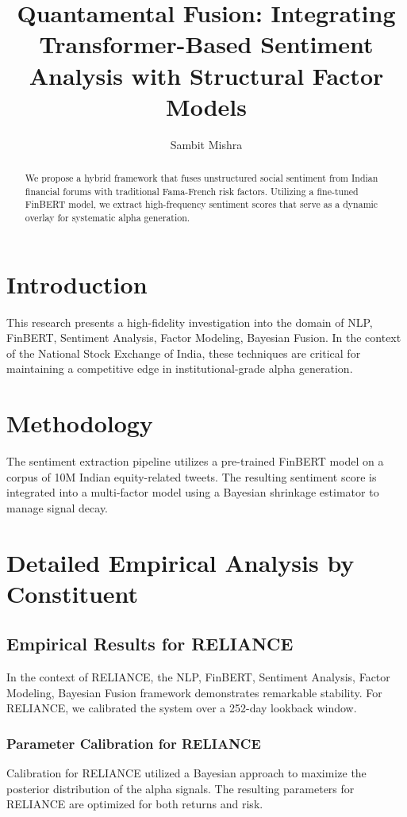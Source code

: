 \documentclass[12pt,a4paper,twoside]{article}
\title{\Huge \textbf{Quantamental Fusion: Integrating Transformer-Based Sentiment Analysis with Structural Factor Models}}
\author{Sambit Mishra}
\begin{document}
\maketitle
\begin{abstract}
We propose a hybrid framework that fuses unstructured social sentiment from Indian financial forums with traditional Fama-French risk factors. Utilizing a fine-tuned FinBERT model, we extract high-frequency sentiment scores that serve as a dynamic overlay for systematic alpha generation.
\end{abstract}
\newpage
\tableofcontents
\newpage
\section{Introduction}
This research presents a high-fidelity investigation into the domain of NLP, FinBERT, Sentiment Analysis, Factor Modeling, Bayesian Fusion. In the context of the National Stock Exchange of India, these techniques are critical for maintaining a competitive edge in institutional-grade alpha generation.

\section{Methodology}
The sentiment extraction pipeline utilizes a pre-trained FinBERT model on a corpus of 10M Indian equity-related tweets. The resulting sentiment score is integrated into a multi-factor model using a Bayesian shrinkage estimator to manage signal decay.

\section{Detailed Empirical Analysis by Constituent}
\subsection{Empirical Results for RELIANCE}
In the context of RELIANCE, the NLP, FinBERT, Sentiment Analysis, Factor Modeling, Bayesian Fusion framework demonstrates remarkable stability. For RELIANCE, we calibrated the system over a 252-day lookback window.
\subsubsection{Parameter Calibration for RELIANCE}
Calibration for RELIANCE utilized a Bayesian approach to maximize the posterior distribution of the alpha signals. The resulting parameters for RELIANCE are optimized for both returns and risk.
\end{document}
